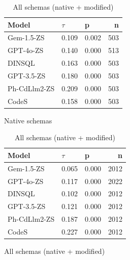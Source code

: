 \begin{table}
  \centering
  \caption{Kendall-Tau ($\tau$) Correlations between \emph{Regular Identifier Proportion} and \emph{Query Recall}.}
  \begin{subfigure}{.5\linewidth}
      \centering
      \caption{Native schemas}
      \begin{tabular}{lllr}
\toprule
Model & $\tau$ & p & n \\
\midrule
Gem-1.5-ZS & 0.109 & 0.002 & 503 \\
GPT-4o-ZS & 0.140 & 0.000 & 513 \\
DINSQL & 0.163 & 0.000 & 503 \\
GPT-3.5-ZS & 0.180 & 0.000 & 503 \\
Ph-CdLlm2-ZS & 0.209 & 0.000 & 503 \\
CodeS & 0.158 & 0.000 & 503 \\
\bottomrule
\end{tabular}

      \label{table:nathigh-recall-ktau-native}
  \end{subfigure}%
  \begin{subfigure}{.5\linewidth}
      \centering
      \caption{All schemas (native + modified)}
      \begin{tabular}{lllr}
\toprule
Model & $\tau$ & p & n \\
\midrule
Gem-1.5-ZS & 0.065 & 0.000 & 2012 \\
GPT-4o-ZS & 0.117 & 0.000 & 2022 \\
DINSQL & 0.102 & 0.000 & 2012 \\
GPT-3.5-ZS & 0.121 & 0.000 & 2012 \\
Ph-CdLlm2-ZS & 0.187 & 0.000 & 2012 \\
CodeS & 0.227 & 0.000 & 2012 \\
\bottomrule
\end{tabular}

      \label{table:nathigh-recall-ktau-all}
  \end{subfigure}
\end{table}

